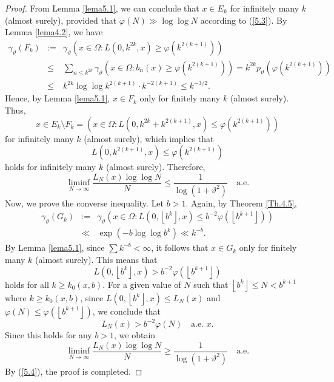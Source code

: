 \documentclass[final,1p,times]{elsarticle}
\numberwithin{equation}{section}
\begin{document}
\begin{proof}
From Lemma \ref{lema5.1}, we can conclude that $x \in E_k$ for infinitely many $k$ (almost surely), provided that $\varphi (N) \gg \log \log N$ according to (\ref{5.3}). By Lemma \ref{lema4.2}, we have
\begin{eqnarray*}
\gamma_{\vartheta}(F_k) &:=& \gamma_{\vartheta} \left( x \in \Omega : L\left( 0, k^{2k}, x \right) \geq \varphi \left(k^{2(k+1)} \right) \right) \\
&\leq& \sum_{n \leq k^{2k}} \gamma_{\vartheta} \left(x \in \Omega : b_n(x) \geq \varphi\left(k^{2(k+1)} \right)  \right) = k^{2k} p_{\vartheta} \left( \varphi \left( k^{2(k+1)}\right) \right)  \\
&\leq& k^{2k} \log \log k^{2(k+1)} \cdot k^{-2(k+1)} \leq k^{-3/2}.
\end{eqnarray*}
Hence, by Lemma \ref{lema5.1}, $x \in F_k$ only for finitely many $k$ (almost surely). Thus, 
\[
x \in E_k \setminus F_k = \left( x \in \Omega : L\left( 0, k^{2k} + k^{2(k+1)}, x\right) \leq \varphi \left(k^{2(k+1)} \right)  \right)
\]
for infinitely many $k$ (almost surely), which implies that 
\[
L\left( 0, k^{2(k+1)}, x \right) \leq \varphi \left(k^{2(k+1)} \right)
\]
holds for infinitely many $k$ (almost surely). Therefore, 
\begin{equation} \label{5.4}
\liminf_{N \to \infty} \frac{L_N(x) \log \log N}{N} \leq \frac{1}{\log \left( 1+ \vartheta^2\right)} \quad \text{a.e.}
\end{equation}
Now, we prove the converse inequality. Let $b > 1$. Again, by Theorem \ref{Th.4.5},
\begin{eqnarray*}
\gamma_{\vartheta}(G_k) &:=& \gamma_{\vartheta} \left( x \in \Omega : L\left( 0, \left\lfloor b^k \right\rfloor, x\right) \leq b^{-2} \varphi \left( \left\lfloor b^{k+1} \right\rfloor \right) \right) \\
&\ll& \exp \left( -b \log \log b^k \right) \ll k^{-b}.
\end{eqnarray*}
By Lemma \ref{lema5.1}, since $\sum k^{-b} < \infty$, it follows that $x \in G_k$ only for finitely many $k$ (almost surely). This means that
\[
L\left( 0, \left\lfloor b^k \right\rfloor, x \right) > b^{-2} \varphi \left( \left\lfloor b^{k+1} \right\rfloor \right)
\]
holds for all $k \geq k_0 (x,b)$. For a given value of $N$ such that $\left\lfloor b^k \right\rfloor \leq N < b^{k+1}$ where $k \geq k_0 (x,b)$, since
$L\left( 0, \left\lfloor b^k \right\rfloor, x \right) \leq L_N(x)$ 
and 
$\varphi (N) \leq \varphi \left( \left\lfloor b^{k+1} \right\rfloor \right)$, we conclude that 
\[
L_N(x) > b^{-2} \varphi(N) \quad \text{a.e. } x.
\]
Since this holds for any $b > 1$, we obtain 
\[
\liminf_{N \to \infty} \frac{L_N(x) \log \log N}{N} \geq \frac{1}{\log \left( 1+ \vartheta^2\right)} \quad \text{a.e.}
\]
By (\ref{5.4}), the proof is completed.
\end{proof}
\end{document}
